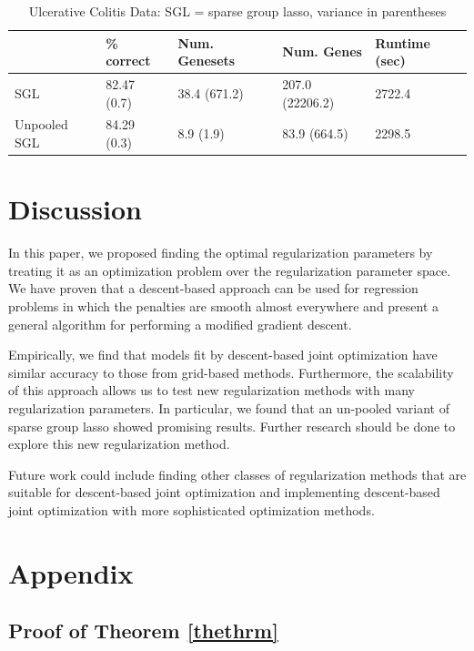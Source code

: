 \documentclass[10pt,letterpaper]{article}
\begin{document}
\begin{table}
\begin{center}
\begin{tabular}{| l | l | l | l | l | }
\hline
 & \% correct  & Num. Genesets & Num. Genes & Runtime (sec) \\
\hline
SGL & 82.47 (0.7) & 38.4 (671.2) & 207.0 (22206.2) & 2722.4 \\
\hline
Unpooled SGL & 84.29 (0.3) & 8.9 (1.9) & 83.9 (664.5) & 2298.5 \\
\hline
\end{tabular}
\end{center}
\caption {Ulcerative Colitis Data: SGL = sparse group lasso, variance in parentheses}
\label{colitis}
\end{table}

\section{Discussion}
In this paper, we proposed finding the optimal regularization parameters by treating it as an optimization problem over the regularization parameter space. We have proven that a descent-based approach can be used for regression problems in which the penalties are smooth almost everywhere and present a general algorithm for performing a modified gradient descent.

Empirically, we find that models fit by descent-based joint optimization have similar accuracy to those from grid-based methods. Furthermore, the scalability of this approach allows us to test new regularization methods with many regularization parameters. In particular, we found that an un-pooled variant of sparse group lasso showed promising results. Further research should be done to explore this new regularization method.

Future work could include finding other classes of regularization methods that are suitable for descent-based joint optimization and implementing descent-based joint optimization with more sophisticated optimization methods.

\section{Appendix}

\subsection{Proof of Theorem \ref{thethrm}}
\end{document}
